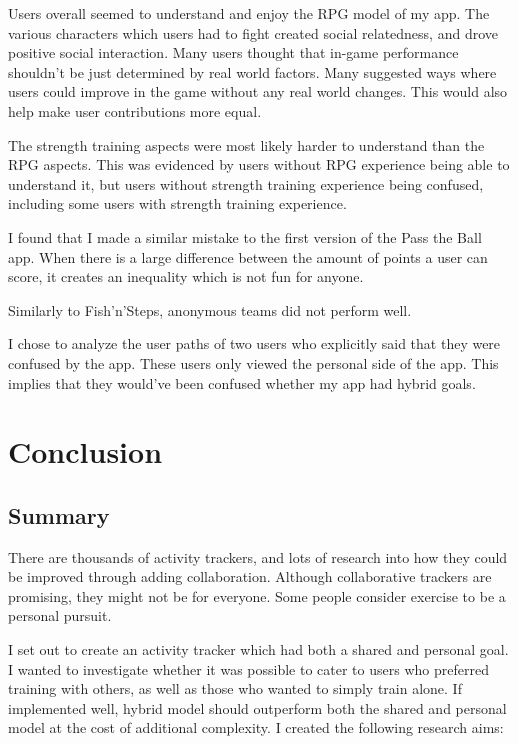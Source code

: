 \documentclass{l4proj}
\begin{document}
Users overall seemed to understand and enjoy the RPG model of my app. The various characters which users had to fight created social relatedness, and drove positive social interaction. Many users thought that in-game performance shouldn't be just determined by real world factors. Many suggested ways where users could improve in the game without any real world changes. This would also help make user contributions more equal. 

The strength training aspects were most likely harder to understand than the RPG aspects. This was evidenced by users without RPG experience being able to understand it, but users without strength training experience being confused, including some users with strength training experience.

I found that I made a similar mistake to the first version of the Pass the Ball app. When there is a large difference between the amount of points a user can score, it creates an inequality which is not fun for anyone.

Similarly to Fish'n'Steps, anonymous teams did not perform well.

I chose to analyze the user paths of two users who explicitly said that they were confused by the app. These users only viewed the personal side of the app. This implies that they would've been confused whether my app had hybrid goals.



\chapter{Conclusion}    
\section{Summary}
There are thousands of activity trackers, and lots of research into how they could be improved through adding collaboration. Although collaborative trackers are promising, they might not be for everyone. Some people consider exercise to be a personal pursuit.

I set out to create an activity tracker which had both a shared and personal goal. I wanted to investigate whether it was possible to cater to users who preferred training with others, as well as those who wanted to simply train alone. If implemented well, hybrid model should outperform both the shared and personal model at the cost of additional complexity. I created the following research aims:
\end{document}
